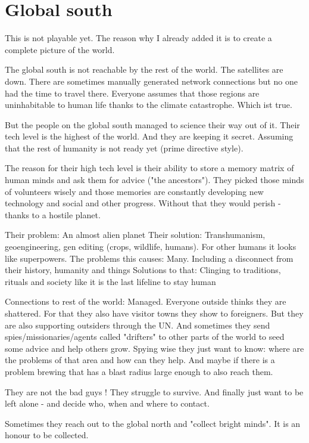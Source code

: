 \section{Global south}

This is not playable yet.
The reason why I already added it is to create a complete picture of the world.

The global south is not reachable by the rest of the world. The satellites are down. There are sometimes manually generated network connections but no one had the time to travel there. Everyone assumes that those regions are uninhabitable to human life thanks to the climate catastrophe. Which ist true.

But the people on the global south managed to science their way out of it. Their tech level is the highest of the world. And they are keeping it secret. Assuming that the rest of humanity is not ready yet (prime directive style).

The reason for their high tech level is their ability to store a memory matrix of human minds and ask them for advice ("the ancestors"). They picked those minds of volunteers wisely and those memories are constantly developing new technology and social and other progress. Without that they would perish - thanks to a hostile planet.

Their problem: An almost alien planet
Their solution: Transhumanism, geoengineering, gen editing (crops, wildlife, humans). For other humans it looks like superpowers.
The problems this causes: Many. Including a disconnect from their history, humanity and things
Solutions to that: Clinging to traditions, rituals and society like it is the last lifeline to stay human

Connections to rest of the world: Managed. Everyone outside thinks they are shattered. For that they also have visitor towns they show to foreigners. But they are also supporting outsiders through the UN. And sometimes they send spies/missionaries/agents called "drifters" to other parts of the world to seed some advice and help others grow. Spying wise they just want to know: where are the problems of that area and how can they help. And maybe if there is a problem brewing that has a blast radius large enough to also reach them.

They are not the bad guys ! They struggle to survive. And finally just want to be left alone - and decide who, when and where to contact.

Sometimes they reach out to the global north and "collect bright minds". It is an honour to be collected.

